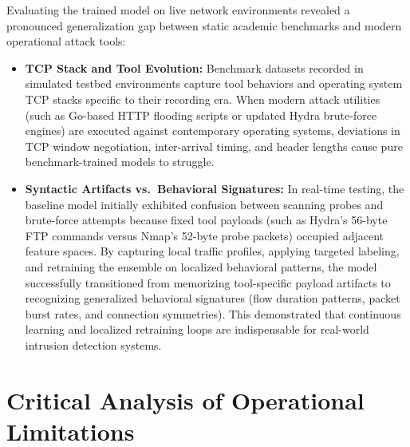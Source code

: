 \documentclass[12pt,a4paper]{report}
\begin{document}
Evaluating the trained model on live network environments revealed a pronounced generalization gap between static academic benchmarks and modern operational attack tools:
\begin{itemize}[leftmargin=*]
    \item \textbf{TCP Stack and Tool Evolution:} Benchmark datasets recorded in simulated testbed environments capture tool behaviors and operating system TCP stacks specific to their recording era. When modern attack utilities (such as Go-based HTTP flooding scripts or updated Hydra brute-force engines) are executed against contemporary operating systems, deviations in TCP window negotiation, inter-arrival timing, and header lengths cause pure benchmark-trained models to struggle.
    \item \textbf{Syntactic Artifacts vs.\ Behavioral Signatures:} In real-time testing, the baseline model initially exhibited confusion between scanning probes and brute-force attempts because fixed tool payloads (such as Hydra's 56-byte FTP commands versus Nmap's 52-byte probe packets) occupied adjacent feature spaces. By capturing local traffic profiles, applying targeted labeling, and retraining the ensemble on localized behavioral patterns, the model successfully transitioned from memorizing tool-specific payload artifacts to recognizing generalized behavioral signatures (flow duration patterns, packet burst rates, and connection symmetries). This demonstrated that continuous learning and localized retraining loops are indispensable for real-world intrusion detection systems.
\end{itemize}

\section{Critical Analysis of Operational Limitations}
\end{document}
